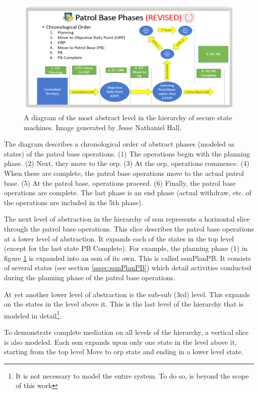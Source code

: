 \documentclass[../../main/main.tex]{subfiles}
\begin{document}
\begin{figure}[h]
\includegraphics[width=\textwidth]{../figures/pbtoplevel}
\caption{\label{pbtoplevel}A diagram of the most abstract level in the hierarchy of secure state machines.  Image generated by Jesse Nathaniel Hall.}
\end{figure}

The diagram describes a chronological order of abstract phases (modeled as states) of the patrol base operations.  (1) The operations begin with the planning phase. (2)  Next, they move to the \gls{orp}. (3) At the \gls{orp}, operations commence. (4)  When these are complete, the patrol base operations move to the actual patrol base.  (5)  At the patrol base, operations proceed.  (6)  Finally, the patrol base operations are complete.  The last phase is an end phase (actual withdraw, etc. of the operations are included in the 5th phase).


The next level of abstraction in the hierarchy of \gls{ssm} represents a horizontal slice through the patrol base operations. This slice describes the patrol base operations at a lower level of abstraction.  It expands each of the states in the top level (except for the last state PB Complete).  For example, the planning phase (1) in figure \ref{pbtoplevel} is expanded into an \gls{ssm} of its own.  This is called ssmPlanPB.  It consists of several states (see section \ref{sssec:ssmPlanPB}) which detail activities conducted during the planning phase of the patrol base operations. 

At yet another lower level of abstraction is the sub-sub (3rd) level.  This expands on the states in the level above it.  This is the last level of the hierarchy that is modeled in detail\footnote{It is not necessary to model the entire system.  To do so, is beyond the scope of this work}.

To demonstrate complete mediation on all levels of the hierarchy, a vertical slice is also modeled.  Each \gls{ssm} expands upon only one state in the level above it, starting from the top level Move to \gls{orp} state and ending in a lower level state. 
\end{document}
